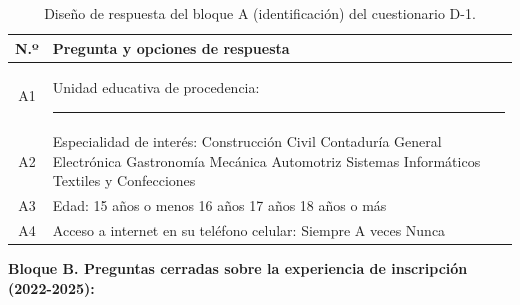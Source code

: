 \begin{table}[htbp]
    \centering
    \caption{Diseño de respuesta del bloque A (identificación) del cuestionario D-1.}
    \label{tab:d1_identificacion}
    \begin{tabularx}{\textwidth}{c L}
        \toprule
        \textbf{N.º} & \textbf{Pregunta y opciones de respuesta} \\
        \midrule
        A1 & Unidad educativa de procedencia: \rule[-2pt]{4.5cm}{0.4pt} \\
        A2 & Especialidad de interés: \casilla{} Construcción Civil \quad \casilla{} Contaduría General \quad \casilla{} Electrónica \quad \casilla{} Gastronomía \quad \casilla{} Mecánica Automotriz \quad \casilla{} Sistemas Informáticos \quad \casilla{} Textiles y Confecciones \\
        A3 & Edad: \casilla{} 15 años o menos \quad \casilla{} 16 años \quad \casilla{} 17 años \quad \casilla{} 18 años o más \\
        A4 & Acceso a internet en su teléfono celular: \casilla{} Siempre \quad \casilla{} A veces \quad \casilla{} Nunca \\
        \bottomrule
    \end{tabularx}
\end{table}

\noindent\textbf{Bloque B. Preguntas cerradas sobre la experiencia de inscripción (2022-2025):}


